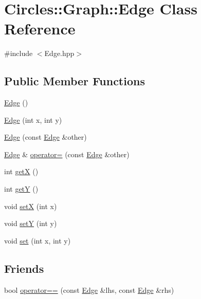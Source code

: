 \hypertarget{class_circles_1_1_graph_1_1_edge}{}\section{Circles\+:\+:Graph\+:\+:Edge Class Reference}
\label{class_circles_1_1_graph_1_1_edge}


{\ttfamily \#include $<$Edge.\+hpp$>$}

\subsection*{Public Member Functions}
\begin{DoxyCompactItemize}
\item 
\hyperlink{class_circles_1_1_graph_1_1_edge_a1216aca8c410cc6015b3c7f5499a99ef}{Edge} ()
\item 
\hyperlink{class_circles_1_1_graph_1_1_edge_ae785946b2536c47df4e38218b19794ea}{Edge} (int x, int y)
\item 
\hyperlink{class_circles_1_1_graph_1_1_edge_a84861f7ebd4da01b4943b640a57550c7}{Edge} (const \hyperlink{class_circles_1_1_graph_1_1_edge}{Edge} \&other)
\item 
\hyperlink{class_circles_1_1_graph_1_1_edge}{Edge} \& \hyperlink{class_circles_1_1_graph_1_1_edge_adddfd55ecff7af40a77b875472033e65}{operator=} (const \hyperlink{class_circles_1_1_graph_1_1_edge}{Edge} \&other)
\item 
int \hyperlink{class_circles_1_1_graph_1_1_edge_a90aa10d5676780244ba7878a0eb004c5}{get\+X} ()
\item 
int \hyperlink{class_circles_1_1_graph_1_1_edge_a4f17f350f047c1c43a580d139054c9ee}{get\+Y} ()
\item 
void \hyperlink{class_circles_1_1_graph_1_1_edge_a4c92864bb8878fd0719d5d500a6bc41a}{set\+X} (int x)
\item 
void \hyperlink{class_circles_1_1_graph_1_1_edge_a90f019d37e3c756b6092c7aecd0fe02c}{set\+Y} (int y)
\item 
void \hyperlink{class_circles_1_1_graph_1_1_edge_a41770bfce297232513138848812f703c}{set} (int x, int y)
\end{DoxyCompactItemize}
\subsection*{Friends}
\begin{DoxyCompactItemize}
\item 
bool \hyperlink{class_circles_1_1_graph_1_1_edge_a8c214bf5445e306ca857f50670e54578}{operator==} (const \hyperlink{class_circles_1_1_graph_1_1_edge}{Edge} \&lhs, const \hyperlink{class_circles_1_1_graph_1_1_edge}{Edge} \&rhs)
\end{DoxyCompactItemize}


